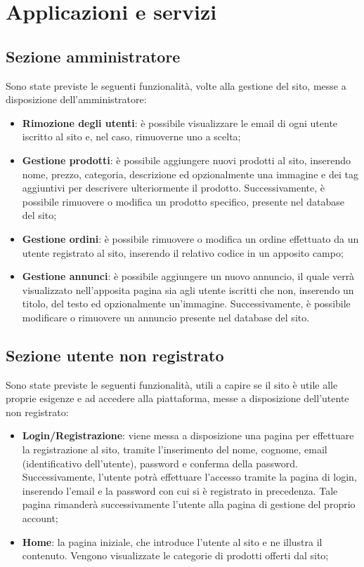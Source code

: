 \section{Applicazioni e servizi} %
	\subsection{Sezione amministratore}
	Sono state previste le seguenti funzionalità, volte alla gestione del sito, messe a disposizione dell'amministratore:
	\begin{itemize}
		\item \textbf{Rimozione degli utenti}: è possibile visualizzare le email di ogni utente iscritto al sito e, nel caso, rimuoverne uno a scelta;
		\item \textbf{Gestione prodotti}: è possibile aggiungere nuovi prodotti al sito, inserendo nome, prezzo, categoria, descrizione ed opzionalmente una immagine e dei tag aggiuntivi per descrivere ulteriormente il prodotto. Successivamente, è possibile rimuovere o modifica un prodotto specifico, presente nel database del sito;
		\item \textbf{Gestione ordini}: è possibile rimuovere o modifica un ordine effettuato da un utente registrato al sito, inserendo il relativo codice in un apposito campo;
		\item \textbf{Gestione annunci}: è possibile aggiungere un nuovo annuncio, il quale verrà visualizzato nell'apposita pagina sia agli utente iscritti che non, inserendo un titolo, del testo ed opzionalmente un'immagine. Successivamente, è possibile modificare o rimuovere un annuncio presente nel database del sito.
	\end{itemize}
	
	\subsection{Sezione utente non registrato}
	Sono state previste le seguenti funzionalità, utili a capire se il sito è utile alle proprie esigenze e ad accedere alla piattaforma, messe a disposizione dell'utente non registrato:
	\begin{itemize}
		\item \textbf{Login/Registrazione}: viene messa a disposizione una pagina per effettuare la registrazione al sito, tramite l'inserimento del nome, cognome, email (identificativo dell'utente), password e conferma della password. Successivamente, l'utente potrà effettuare l'accesso tramite la pagina di login, inserendo l'email e la password con cui si è registrato in precedenza. Tale pagina rimanderà successivamente l'utente alla pagina di gestione del proprio account;
		\item \textbf{Home}: la pagina iniziale, che introduce l'utente al sito e ne illustra il contenuto. Vengono visualizzate le categorie di prodotti offerti dal sito;
	\end{itemize}
